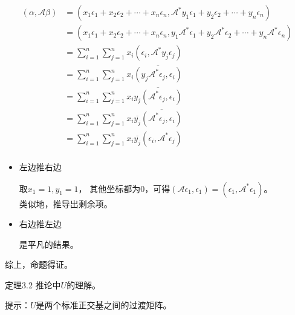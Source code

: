 \documentclass{article}
\begin{document}
\begin{align*}
  (\alpha, \mathscr{A}\beta)
   & = (x_1 \epsilon_1 + x_2 \epsilon_2 + \cdots + x_n \epsilon_n, \mathscr{A}^* y_1 \epsilon_1 + y_2 \epsilon_2 + \cdots + y_n \epsilon_n)                           \\
   & = (x_1 \epsilon_1 + x_2 \epsilon_2 + \cdots + x_n \epsilon_n, y_1 \mathscr{A}^* \epsilon_1 + y_2 \mathscr{A}^*\epsilon_2 + \cdots + y_n \mathscr{A}^*\epsilon_n) \\
   & = \sum \limits_{i = 1}^n \sum \limits_{j = 1}^n x_i (\epsilon_i, \mathscr{A}^* y_j \epsilon_j)                                                                   \\
   & = \sum \limits_{i = 1}^n \sum \limits_{j = 1}^n x_i \overline{(y_j \mathscr{A}^* \epsilon_j, \epsilon_i)}                                                        \\
   & = \sum \limits_{i = 1}^n \sum \limits_{j = 1}^n x_i \overline{y_j(\mathscr{A}^* \epsilon_j, \epsilon_i)}                                                         \\
   & = \sum \limits_{i = 1}^n \sum \limits_{j = 1}^n x_i \overline{y_j}\overline{(\mathscr{A}^* \epsilon_j, \epsilon_i)}                                              \\
   & = \sum \limits_{i = 1}^n \sum \limits_{j = 1}^n x_i \overline{y_j}(\epsilon_i, \mathscr{A}^* \epsilon_j)                                                         \\
\end{align*}
\begin{itemize}
  \item 左边推右边

        取$x_1 = 1, y_1 = 1$，
        其他坐标都为$0$，可得$(\mathscr{A}\epsilon_1, \epsilon_1) = (\epsilon_1, \mathscr{A}^*\epsilon_1)$。 \\
        类似地，推导出剩余项。

  \item 右边推左边

        是平凡的结果。
\end{itemize}
综上，命题得证。

\begin{zremark}
  定理3.2 推论中$U$的理解。
\end{zremark}

提示：$U$是两个标准正交基之间的过渡矩阵。
\end{document}
